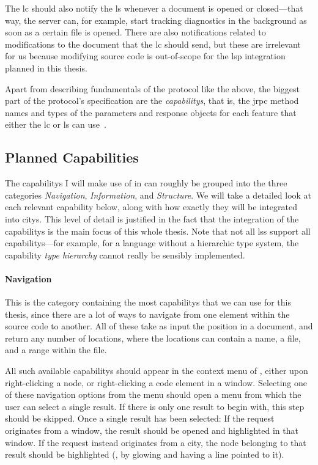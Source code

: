 \documentclass[../thesis]{subfiles}
\begin{document}
The \gls{lc} should also notify the \gls{ls} whenever a document is opened or closed---that way, the server can, for example, start tracking diagnostics in the background as soon as a certain file is opened.
There are also notifications related to modifications to the document that the \gls{lc} should send, but these are irrelevant for us because modifying source code is out-of-scope for the \gls{lsp} integration planned in this thesis.

Apart from describing fundamentals of the protocol like the above, the biggest part of the protocol's specification are the \emph{\glspl{capability}}, that is, the \gls{jrpc} method names and types of the parameters and response objects for each feature that either the \gls{lc} or \gls{ls} can use~\cite{lsp}.

\subsection{Planned Capabilities}\label{subsec:capabilities}
The \glspl{capability} I will make use of in \SEE{} can roughly be grouped into the three categories \emph{Navigation}, \emph{Information}, and \emph{Structure}.
We will take a detailed look at each relevant \gls{capability} below, along with how exactly they will be integrated into \glspl{city}.
This level of detail is justified in the fact that the integration of the \glspl{capability} is the main focus of this whole thesis.
Note that not all \glspl{ls} support all \glspl{capability}---for example, for a language without a hierarchic type system, the \gls{capability} \emph{type hierarchy} cannot really be sensibly implemented.

\paragraph{Navigation}
This is the category containing the most \glspl{capability} that we can use for this thesis, since there are a lot of ways to navigate from one element within the source code to another.
All of these take as input the position in a document, and return any number of locations, where the locations can contain a name, a file, and a \gls{range} within the file.

All such available \glspl{capability} should appear in the context menu of \SEE{}, either upon right-clicking a node, or right-clicking a code element in a \gls{window}.
Selecting one of these navigation options from the menu should open a menu from which the user can select a single result.
If there is only one result to begin with, this step should be skipped.
Once a single result has been selected:
If the request originates from a \gls{window}, the result should be opened and highlighted in that window.
If the request instead originates from a \gls{city}, the node belonging to that result should be highlighted (\eg, by glowing and having a line pointed to it).
\end{document}

